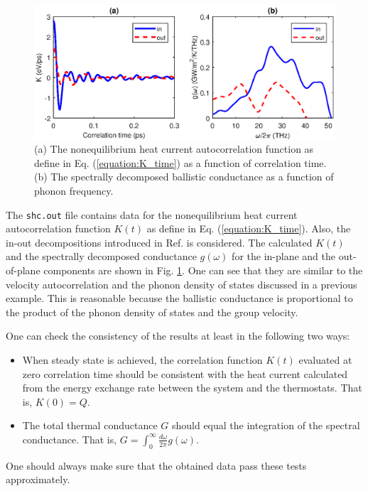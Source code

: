 \documentclass[12pt,a4paper]{report}
\begin{document}
\begin{figure}[h]
\begin{center}
\includegraphics[width=\columnwidth]{ex4b.eps}
\caption{(a) The nonequilibrium heat current autocorrelation function as define in Eq. (\ref{equation:K_time}) as a function of correlation time. (b) The spectrally decomposed ballistic conductance as a function of phonon frequency. }
\label{figure:ex4b}
\end{center}
\end{figure}


The \verb"shc.out" file contains data for the nonequilibrium heat current autocorrelation function $K(t)$ as define in Eq. (\ref{equation:K_time}). Also, the in-out decompositions introduced in Ref. \cite{fan2017prb} is considered. The calculated $K(t)$ and the spectrally decomposed conductance $g(\omega)$ for the in-plane and the out-of-plane components are shown in Fig. \ref{figure:ex4b}. One can see that they are similar to the velocity autocorrelation and the phonon density of states discussed in a previous example. This is reasonable because the ballistic conductance is proportional to the product of the phonon density of states and the group velocity.

One can check the consistency of the results at least in the following two ways:
\begin{itemize}
\item When steady state is achieved, the correlation function $K(t)$ evaluated at zero correlation time should be consistent with the heat current calculated from the energy exchange rate between the system and the thermostats. That is, $K(0)=Q$.
\item The total thermal conductance $G$ should equal the integration of the spectral conductance. That is, $G = \int_0^{\infty} \frac{d\omega}{2\pi} g(\omega)$.
\end{itemize}
One should always make sure that the obtained data pass these tests approximately.
\end{document}
